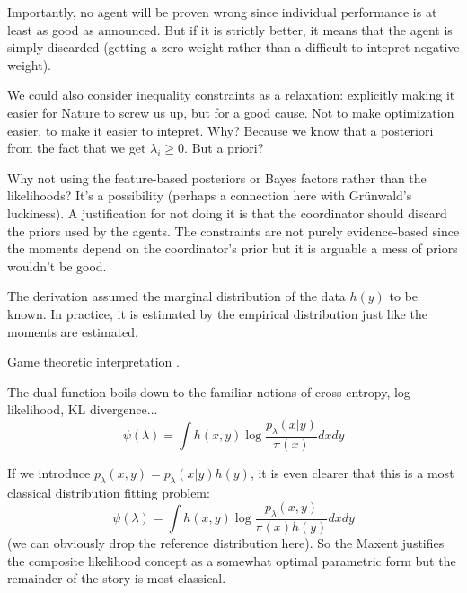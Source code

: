 \documentclass[english]{scrartcl}
\begin{document}
Importantly, no agent will be proven wrong since individual performance is at least as good as announced. But if it is strictly better, it means that the agent is simply discarded (getting a zero weight rather than a difficult-to-intepret negative weight).  

We could also consider inequality constraints as a relaxation: explicitly making it easier for Nature to screw us up, but for a good cause. Not to make optimization easier, to make it easier to intepret. Why? Because we know that a posteriori from the fact that we get $\lambda_i\geq 0$. But a priori?



Why not using the feature-based posteriors or Bayes factors rather than the likelihoods? It's a possibility (perhaps a connection here with Gr\"unwald's luckiness). A justification for not doing it is that the coordinator should discard the priors used by the agents. The constraints are not purely evidence-based since the moments depend on the coordinator's prior but it is arguable a mess of priors wouldn't be good.


The derivation assumed the marginal distribution of the data $h(y)$ to be known. In practice, it is estimated by the empirical distribution just like the moments are estimated.

Game theoretic interpretation \cite{Grunwald-04}.

The dual function boils down to the familiar notions of cross-entropy, log-likelihood, KL divergence...
$$
\psi(\lambda)
= \int h(x,y) \log \frac{p_\lambda(x|y)}{\pi(x)} dx dy
$$

If we introduce $p_\lambda(x,y)=p_\lambda(x|y)h(y)$, it is even clearer that this is a most classical distribution fitting problem:
$$
\psi(\lambda)
= \int h(x,y) \log \frac{p_\lambda(x,y)}{\pi(x)h(y)} dx dy
$$
(we can obviously drop the reference distribution here). So the Maxent justifies the composite likelihood concept as a somewhat optimal parametric form but the remainder of the story is most classical.
\end{document}
